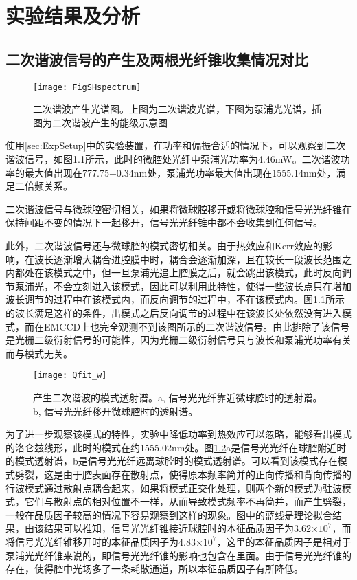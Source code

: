 \chapter{实验结果及分析}
\label{sec:measurement}

\section{二次谐波信号的产生及两根光纤锥收集情况对比}

\begin{figure}
\centering
\texttt{[image: FigSHspectrum]}
\caption{二次谐波产生光谱图。上图为二次谐波光谱，下图为泵浦光光谱，插图为二次谐波产生的能级示意图}
\label{pic:FigSHspectrum}
\end{figure}

使用\ref{sec:ExpSetup}中的实验装置，在功率和偏振合适的情况下，可以观察到二次谐波信号，如图\ref{pic:FigSHspectrum}所示，此时的微腔处光纤中泵浦光功率为4.46mW。二次谐波功率的最大值出现在777.75$\pm0.34$nm处，泵浦光功率最大值出现在1555.14nm处，满足二倍频关系。


二次谐波信号与微球腔密切相关，如果将微球腔移开或将微球腔和信号光光纤锥在保持间距不变的情况下一起移开，信号光光纤锥中都不会收集到任何信号。

此外，二次谐波信号还与微球腔的模式密切相关。由于热效应和Kerr效应的影响，在波长逐渐增大耦合进腔膜中时，耦合会逐渐加深，且在较长一段波长范围之内都处在该模式之中，但一旦泵浦光追上腔膜之后，就会跳出该模式，此时反向调节泵浦光，不会立刻进入该模式\cite{carmon2004dynamical}，因此可以利用此特性，使得一些波长点只在增加波长调节的过程中在该模式内，而反向调节的过程中，不在该模式内。图\ref{pic:FigSHspectrum}所示的波长满足这样的条件，出模式之后反向调节的过程中在该波长处依然没有进入模式，而在EMCCD上也完全观测不到该图所示的二次谐波信号。由此排除了该信号是光栅二级衍射信号的可能性，因为光栅二级衍射信号只与波长和泵浦光功率有关而与模式无关。

\begin{figure}
\centering
\texttt{[image: Qfit\_w]}
\caption{产生二次谐波的模式透射谱。a, 信号光光纤靠近微球腔时的透射谱。b, 信号光光纤移开微球腔时的透射谱。}
\label{pic:Qfit_w}
\end{figure}

为了进一步观察该模式的特性，实验中降低功率到热效应可以忽略，能够看出模式的洛仑兹线形，此时的模式在约1555.02nm处。图\ref{pic:Qfit_w}a是信号光光纤在球腔附近时的模式透射谱，b是信号光光纤远离球腔时的模式透射谱。可以看到该模式存在模式劈裂，这是由于腔表面存在散射点，使得原本频率简并的正向传播和背向传播的行波模式通过散射点耦合起来，如果将模式正交化处理，则两个新的模式为驻波模式，它们与散射点的相对位置不一样，从而导致模式频率不再简并，而产生劈裂\cite{cao2017experimental}，一般在品质因子较高的情况下容易观察到这样的现象。图中的蓝线是理论拟合结果，由该结果可以推知，信号光光纤锥接近球腔时的本征品质因子为3.62$\times 10^7$，而将信号光光纤锥移开时的本征品质因子为4.83$\times 10^7$，这里的本征品质因子是相对于泵浦光光纤锥来说的，即信号光光纤锥的影响也包含在里面。由于信号光光纤锥的存在，使得腔中光场多了一条耗散通道，所以本征品质因子有所降低。

